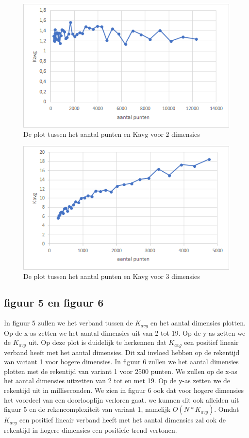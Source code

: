 \documentclass[12pt]{article}
\begin{document}
\begin{figure}
\includegraphics[width=\textwidth]{punten-Kavg}
\caption{De plot tussen het aantal punten en Kavg voor 2 dimensies}
\end{figure}

\begin{figure}
\includegraphics[width=\textwidth]{punten-Kavgdim3.png}
\caption{De plot tussen het aantal punten en Kavg voor 3 dimensies}
\end{figure}



\subsection{figuur 5 en figuur 6}

In figuur 5 zullen we het verband tussen de $K_{avg}$ en het aantal dimensies plotten.
Op de x-as zetten we het aantal dimensies uit van 2 tot 19.
Op de y-as zetten we de $K_{avg}$ uit.
Op deze plot is duidelijk te herkennen dat $K_{avg}$ een positief lineair verband heeft met het aantal dimensies.
Dit zal invloed hebben op de rekentijd van variant 1 voor hogere dimensies.
In figuur 6 zullen we het aantal dimensies plotten met de rekentijd van variant 1 voor 2500 punten.
We zullen op de x-as het aantal dimensies uitzetten van 2 tot en met 19.
Op de y-as zetten we de rekentijd uit in milliseconden.
We zien in figuur 6 ook dat voor hogere dimensies het voordeel van een doorlooplijn verloren gaat.
we kunnen dit ook afleiden uit figuur 5 en de rekencomplexiteit van variant 1, namelijk $O(N*K_{avg})$.
Omdat $K_{avg}$ een positief lineair verband heeft met het aantal dimensies zal ook de rekentijd in hogere dimensies een positiefe trend vertonen.
\end{document}
